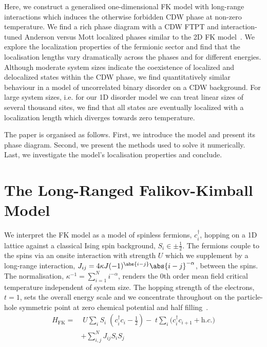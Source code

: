 Here, we construct a generalised one-dimensional \ac{FK} model with long-range interactions which induces the otherwise forbidden \ac{CDW} phase at non-zero temperature. We find a rich phase diagram with a CDW FTPT and interaction-tuned Anderson versus Mott localized phases similar to the 2D \ac{FK} model~\cite{antipovInteractionTunedAndersonMott2016}. We explore the localization properties of the fermionic sector and find that the localisation lengths vary dramatically across the phases and for different energies. Although moderate system sizes indicate the coexistence of localized and delocalized states within the CDW phase, we find quantitatively similar behaviour in a model of uncorrelated binary disorder on a \ac{CDW} background. For large system sizes, i.e. for our 1D disorder model we can treat linear sizes of several thousand sites, we find that all states are eventually localized with a localization length which diverges towards zero temperature.   

The paper is organised as follows. First, we introduce the model and present its phase diagram. Second, we present the methods used to solve it numerically. Last, we investigate the model's localisation properties and conclude.

\section{The Long-Ranged Falikov-Kimball Model}
We interpret the \ac{FK} model as a model of spinless fermions, \(c^\dag_{i}\), hopping on a 1D lattice against a classical Ising spin background, \(S_i \in {\pm \frac{1}{2}}\). The fermions couple to the spins via an onsite interaction with strength \(U\) which we supplement by a long-range interaction, \(J_{ij} = 4\kappa J (-1)^{\abs{i-j}} \abs{i-j}^{-\alpha}\), between the spins. The normalisation, \(\kappa^{-1} = \sum_{i=1}^{N} i^{-\alpha}\), renders the 0th order mean field critical temperature independent of system size. The hopping strength of the electrons, \(t = 1\), sets the overall energy scale and we concentrate throughout on the particle-hole symmetric point at zero chemical potential and half filling~\cite{gruberFalicovKimballModelReview1996}.
~
\begin{align}
H_{\mathrm{FK}} = & \;U \sum_{i} S_i\;(c^\dag_{i}c_{i} - \tfrac{1}{2}) -\;t \sum_{i} (c^\dag_{i}c_{i+1} + \textit{h.c.)}\\ 
 &  + \sum_{i, j}^{N} J_{ij}  S_i S_j \nonumber
\label{eq:HFK}
\end{align}

